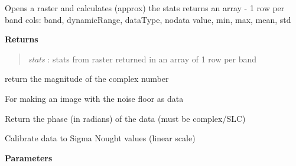 \documentclass[letterpaper,10pt,openany,oneside]{sphinxmanual}
\begin{document}
\begin{fulllineitems}

\begin{fulllineitems}
\label{code:Image.Image.getImgStats}
Opens a raster and calculates (approx) the stats
returns an array - 1 row per band
cols: band, dynamicRange, dataType, nodata value, min, max, mean, std

\textbf{Returns}
\begin{quote}

\emph{stats} : stats from raster returned in an array of 1 row per band
\end{quote}

\end{fulllineitems}


\begin{fulllineitems}
\label{code:Image.Image.getMag}
return the magnitude of the complex number

\end{fulllineitems}


\begin{fulllineitems}
\label{code:Image.Image.getNoise}
For making an image with the noise floor as data

\end{fulllineitems}


\begin{fulllineitems}
\label{code:Image.Image.getPhase}
Return the phase (in radians) of the data (must be complex/SLC)

\end{fulllineitems}


\begin{fulllineitems}
\label{code:Image.Image.getSigma}
Calibrate data to Sigma Nought values (linear scale)

\textbf{Parameters}
\begin{quote}


\end{quote}
\end{fulllineitems}
\end{fulllineitems}
\end{document}
